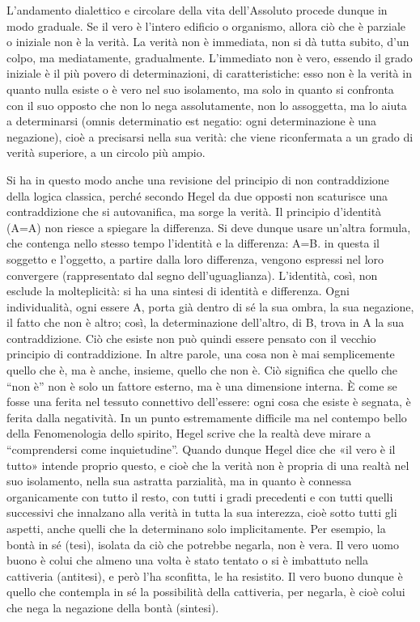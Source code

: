 \documentclass[a4paper,12pt,oneside,openany]{book}%
\begin{document}
L’andamento dialettico e circolare della vita dell’Assoluto procede dunque in modo graduale. Se il vero è l’intero edificio o organismo, allora ciò che è parziale o iniziale non è la verità. La verità non è immediata, non si dà tutta subito, d’un colpo, ma mediatamente, gradualmente. L’immediato non è vero, essendo il grado iniziale è il più povero di determinazioni, di caratteristiche: esso non è la verità in quanto nulla esiste o è vero nel suo isolamento, ma solo in quanto si confronta con il suo opposto che non lo nega assolutamente, non lo assoggetta, ma lo aiuta a determinarsi (omnis determinatio est negatio: ogni determinazione è una negazione), cioè a precisarsi nella sua verità: che viene riconfermata a un grado di verità superiore, a un circolo più ampio.

Si ha in questo modo anche una revisione del principio di non contraddizione della logica classica, perché secondo Hegel da due opposti non scaturisce una contraddizione che si autovanifica, ma sorge la verità. Il principio d’identità (A=A) non riesce a spiegare la differenza. Si deve dunque usare un’altra formula, che contenga nello stesso tempo l’identità e la differenza: A=B. in questa il soggetto e l’oggetto, a partire dalla loro differenza, vengono espressi nel loro convergere (rappresentato dal segno dell’uguaglianza). L’identità, così, non esclude la molteplicità: si ha una sintesi di identità e differenza. Ogni individualità, ogni essere A, porta già dentro di sé la sua ombra, la sua negazione, il fatto che non è altro; così, la determinazione dell’altro, di B, trova in A la sua contraddizione. Ciò che esiste non può quindi essere pensato con il vecchio principio di contraddizione. In altre parole, una cosa non è mai semplicemente quello che è, ma è anche, insieme, quello che non è. Ciò significa che quello che “non è” non è solo un fattore esterno, ma è una dimensione interna. È come se fosse una ferita nel tessuto connettivo dell’essere: ogni cosa che esiste è segnata, è ferita dalla negatività. In un punto estremamente difficile ma nel contempo bello della Fenomenologia dello spirito, Hegel scrive che la realtà deve mirare a “comprendersi come inquietudine”. Quando dunque Hegel dice che «il vero è il tutto» intende proprio questo, e cioè che la verità non è propria di una realtà nel suo isolamento, nella sua astratta parzialità, ma in quanto è connessa organicamente con tutto il resto, con tutti i gradi precedenti e con tutti quelli successivi che innalzano alla verità in tutta la sua interezza, cioè sotto tutti gli aspetti, anche quelli che la determinano solo implicitamente. Per esempio, la bontà in sé (tesi), isolata da ciò che potrebbe negarla, non è vera. Il vero uomo buono è colui che almeno una volta è stato tentato o si è imbattuto nella cattiveria (antitesi), e però l’ha sconfitta, le ha resistito. Il vero buono dunque è quello che contempla in sé la possibilità della cattiveria, per negarla, è cioè colui che nega la negazione della bontà (sintesi).
\end{document}
